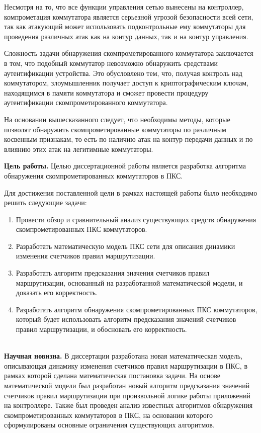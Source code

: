 \documentclass[14pt,autoref,href]{disser}
\theoremstyle{definition}
\begin{document}
Несмотря на то, что все функции управления сетью вынесены на контроллер, компрометация коммутатора является серьезной угрозой безопасности всей сети, так как атакующий может использовать подконтрольные ему коммутаторы для проведения различных атак как на контур данных, так и на контур управления.

Сложность задачи обнаружения скомпрометированного коммутатора заключается в том, что подобный коммутатор невозможно обнаружить средствами аутентификации устройства.
Это обусловлено тем, что, получая контроль над коммутатором, злоумышленник получает доступ к криптографическим ключам, находящимся в памяти коммутатора и сможет провести процедуру аутентификации скомпрометированного коммутатора.

На основании вышесказанного следует, что необходимы методы, которые позволят обнаружить скомпрометированные коммутаторы по различным косвенным признакам, то есть по наличию атак на контур передачи данных и по влиянию этих атак на легитимные коммутаторы.

\textbf{Цель работы.} Целью диссертационной работы является разработка алгоритма обнаружения скомпрометированных коммутаторов в ПКС.

Для достижения поставленной цели в рамках настоящей работы было необходимо решить следующие задачи:

\begin{enumerate}
\item Провести обзор и сравнительный анализ существующих средств обнаружения скомпрометированных ПКС коммутаторов.
\item Разработать математическую модель ПКС сети для описания динамики изменения счетчиков правил маршрутизации.
\item Разработать алгоритм предсказания значения счетчиков правил маршрутизации, основанный на разработанной математической модели, и доказать его корректность.
\item Разработать алгоритм обнаружения скомпрометированных ПКС коммутаторов, который будет использовать алгоритм предсказания значений счетчиков правил маршрутизации, и обосновать его корректность.
\end{enumerate}
\ \\

\textbf{Научная новизна.} В диссертации разработана новая математическая модель, описывающая динамику изменения счетчиков правил маршрутизации в ПКС, в рамках которой сделана математическая постановка задачи.
На основе математической модели был разработан новый алгоритм предсказания значений счетчиков правил маршрутизации при произвольной логике работы приложений на контроллере.
Также был проведен анализ известных алгоритмов обнаружения скомпрометированных коммутаторов в ПКС, на основании которого сформулированы основные ограничения существующих алгоритмов.
\end{document}
